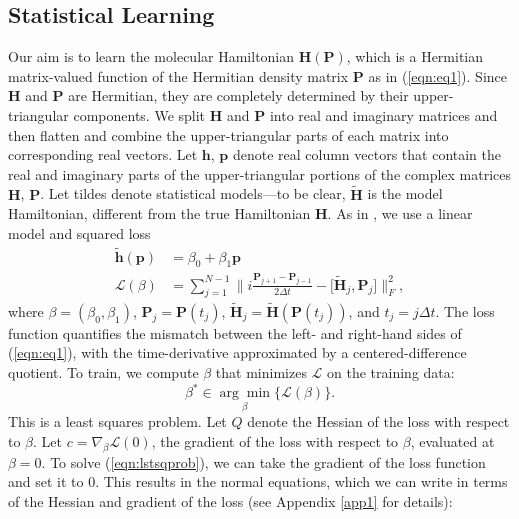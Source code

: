 \documentclass[10pt]{article}
\begin{document}
\subsection{Statistical Learning}
\label{sect:statlearning}
Our aim is to learn the molecular Hamiltonian $\mathbf{H}(\mathbf{P})$, which is a Hermitian matrix-valued function of the Hermitian density matrix $\mathbf{P}$ as in (\ref{eqn:eq1}).  Since $\mathbf{H}$ and $\mathbf{P}$ are Hermitian, they are completely determined by their upper-triangular components. We split $\mathbf{H}$ and $\mathbf{P}$ into real and imaginary matrices and then flatten and combine the upper-triangular parts of each matrix into corresponding real vectors. Let $\mathbf{h}$, $\mathbf{p}$ denote real column vectors that contain the real and imaginary parts of the upper-triangular portions of the complex matrices $\mathbf{H}$, $\mathbf{P}$. Let tildes denote statistical models---to be clear, $\widetilde{\mathbf{H}}$ is the model Hamiltonian, different from the true Hamiltonian $\mathbf{H}$.  As in \cite{bhat2020machine}, we use a linear model and squared loss
\begin{align}
    \label{eqn:hammodel}
    \widetilde{\mathbf{h}}(\mathbf{p}) &= \beta_0 + \beta_1 \mathbf{p} \\
\label{eqn:sseloss}
    \mathcal{L}( \beta ) &= \sum_{j=1}^{N-1} \biggl\| i  \frac{\mathbf{P}_{j+1} - \mathbf{P}_{j-1}}{2 \Delta t}
    -  \big [   \widetilde{\mathbf{H}}_j , \mathbf{P}_j \big] \bigg\|_F^2,
\end{align}
where  $\beta = (\beta_0, \beta_1)$, $\mathbf{P}_j = \mathbf{P}(t_j)$, $\widetilde{\mathbf{H}}_j = \widetilde{\mathbf{H}}(\mathbf{P}(t_j))$, and $t_j = j \Delta t$.  The loss function quantifies the mismatch between the left- and right-hand sides of (\ref{eqn:eq1}), with the time-derivative approximated by a centered-difference quotient.  To train, we compute $\beta$ that minimizes $\mathcal{L}$ on the training data:
\begin{equation}
\label{eqn:lstsqprob}
    \beta^* \in \underset{\beta}{\arg\min} \{\mathcal{L}(\beta)\}.
\end{equation} 
This is a least squares problem. Let $Q$ denote the Hessian of the loss with respect to $\beta$.  Let $c = \nabla_{\beta}\mathcal{L}( 0 )$, the gradient of the loss with respect to $\beta$, evaluated at $\beta=0$.  To solve (\ref{eqn:lstsqprob}), we can take the gradient of the loss function and set it to 0. This results in the normal equations, which we can write in terms of the Hessian and gradient of the loss (see Appendix \ref{app1} for details):
\end{document}
